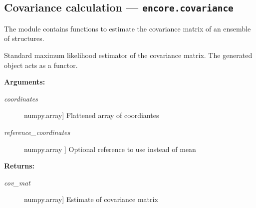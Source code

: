 \documentclass[letterpaper,10pt,english]{sphinxmanual}
\begin{document}
\subsection{Covariance calculation --- \texttt{encore.covariance}}
\label{index:covariance-calculation-encore-covariance}
The module contains functions to estimate the covariance matrix of
an ensemble of structures.

\begin{fulllineitems}
\label{index:encore.covariance.EstimatorML}
Standard maximum likelihood estimator of the covariance matrix. 
The generated object acts as a functor.

\begin{fulllineitems}
\label{index:encore.covariance.EstimatorML.calculate}
\textbf{Arguments:}
\begin{description}
\item[{\emph{coordinates}}] \leavevmode{[}numpy.array{]}
Flattened array of coordiantes

\item[{\emph{reference\_coordinates}}] \leavevmode{[}numpy.array {]}
Optional reference to use instead of mean

\end{description}

\textbf{Returns:}
\begin{description}
\item[{\emph{cov\_mat}}] \leavevmode{[}numpy.array{]}
Estimate of  covariance matrix

\end{description}

\end{fulllineitems}


\end{fulllineitems}

\end{document}
